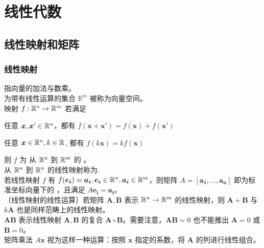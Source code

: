 \documentclass[./main.tex]{subfiles}
\begin{document}
\chapter{线性代数}

\section{线性映射和矩阵}

\subsection{线性映射}

指向量的加法与数乘。\\

为带有线性运算的集合 $\mathbb{R}^m$ 被称为向量空间。\\

映射 $f:\mathbb{R}^{n}\rightarrow\mathbb{R}^{m}$ 若满足
\begin{enumerate*}
    \item 任意 $\bm{x},\bm{x}'\in\mathbb{R}^{n}$，都有 $f(\bm{x}+\bm{x'})=f(\bm{x})+f(\bm{x'})$
    \item 任意 $\bm{x}\in\mathbb{R}^{n},k\in\mathbb{R}^{}$, 都有 $f(k\bm{x})=kf(\bm{x})$
\end{enumerate*}
 则 $f$ 为 从 $\mathbb{R}^{n}$ 到 $\mathbb{R}^{m}$ 的 。\\

从 $\mathbb{R}^{n}$ 到 $\mathbb{R}^{n}$ 的线性映射称为.\\

若线性映射 $f$ 有 $f(\bm{e_i})=\bm{a_i},\bm{e_i}\in\mathbb{R}^{n}, \bm{a_i}\in\mathbb{R}^{m}$，则矩阵 $A=[\bm{a_1},\dots,\bm{a_n}]$ 即为标准坐标向量下的 ，且满足 $A\bm{e_i}=\bm{a_i}$。\\

（线性映射的线性运算）若矩阵 $\bm{A},\bm{B}$ 表示 $\mathbb{R}^{n}\rightarrow\mathbb{R}^{m}$ 的线性映射，则 $\bm{A}+\bm{B}$ 与 $k\bm{A}$ 也是同样范畴上的线性映射。\\

$\bm{AB}$ 表示线性映射 $\bm{A},\bm{B}$ 的复合 $\bm{A}\circ\bm{B}$。需要注意，$\bm{AB}=0$ 也不能推出 $\bm{A}=0$ 或 $\bm{B}=0$。\\

矩阵乘法 $A\bm{x}$ 视为这样一种运算：按照 $\bm{x}$ 指定的系数，将 $\bm{A}$ 的列进行线性组合。\\
\end{document}
